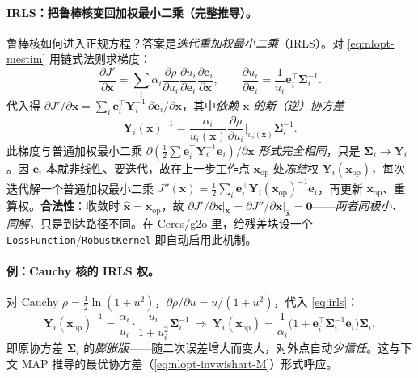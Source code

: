 \paragraph{IRLS：把鲁棒核变回加权最小二乘（完整推导）。}\cite{barfoot2024state}
鲁棒核如何进入正规方程？答案是\emph{迭代重加权最小二乘}（IRLS）。对 \cref{eq:nlopt-mestim} 用链式法则求梯度：
\begin{equation}
  \frac{\partial J'}{\partial\mathbf{x}}=\sum_i\alpha_i\frac{\partial\rho}{\partial u_i}\frac{\partial u_i}{\partial\mathbf{e}_i}\frac{\partial\mathbf{e}_i}{\partial\mathbf{x}},
  \qquad \frac{\partial u_i}{\partial\mathbf{e}_i}=\frac{1}{u_i}\mathbf{e}_i^\top\boldsymbol{\Sigma}_i^{-1}.
  \label{eq:nlopt-irls-grad}
\end{equation}
代入得 $\partial J'/\partial\mathbf{x}=\sum_i\mathbf{e}_i^\top\mathbf{Y}_i^{-1}\,\partial\mathbf{e}_i/\partial\mathbf{x}$，其中\emph{依赖 $\mathbf{x}$ 的新（逆）协方差}
\begin{equation}
  \mathbf{Y}_i(\mathbf{x})^{-1}=\frac{\alpha_i}{u_i(\mathbf{x})}\frac{\partial\rho}{\partial u_i}\Big|_{u_i(\mathbf{x})}\boldsymbol{\Sigma}_i^{-1}.
  \label{eq:irls}
\end{equation}
此梯度与普通加权最小二乘 $\partial(\tfrac12\sum\mathbf{e}_i^\top\mathbf{Y}_i^{-1}\mathbf{e}_i)/\partial\mathbf{x}$ \emph{形式完全相同}，只是 $\boldsymbol{\Sigma}_i\to\mathbf{Y}_i$。因 $\mathbf{e}_i$ 本就非线性、要迭代，故在上一步工作点 $\mathbf{x}_{\mathrm{op}}$ 处\emph{冻结}权 $\mathbf{Y}_i(\mathbf{x}_{\mathrm{op}})$，每次迭代解一个普通加权最小二乘 $J''(\mathbf{x})=\tfrac12\sum_i\mathbf{e}_i^\top\mathbf{Y}_i(\mathbf{x}_{\mathrm{op}})^{-1}\mathbf{e}_i$，再更新 $\mathbf{x}_{\mathrm{op}}$、重算权。\textbf{合法性}：收敛时 $\hat{\mathbf{x}}=\mathbf{x}_{\mathrm{op}}$，故 $\partial J'/\partial\mathbf{x}|_{\hat{\mathbf{x}}}=\partial J''/\partial\mathbf{x}|_{\hat{\mathbf{x}}}=\mathbf{0}$——\emph{两者同极小、同解}，只是到达路径不同。在 Ceres/g2o 里，给残差块设一个 \texttt{LossFunction}/\texttt{RobustKernel} 即自动启用此机制。

\paragraph{例：Cauchy 核的 IRLS 权。}\cite{barfoot2024state}
对 Cauchy $\rho=\tfrac12\ln(1+u^2)$，$\partial\rho/\partial u=u/(1+u^2)$，代入 \cref{eq:irls}：
\begin{equation}
  \mathbf{Y}_i(\mathbf{x}_{\mathrm{op}})^{-1}=\frac{\alpha_i}{u_i}\cdot\frac{u_i}{1+u_i^2}\boldsymbol{\Sigma}_i^{-1}
  \ \Rightarrow\ \mathbf{Y}_i(\mathbf{x}_{\mathrm{op}})=\frac{1}{\alpha_i}\big(1+\mathbf{e}_i^\top\boldsymbol{\Sigma}_i^{-1}\mathbf{e}_i\big)\boldsymbol{\Sigma}_i,
  \label{eq:nlopt-cauchy-Y}
\end{equation}
即原协方差 $\boldsymbol{\Sigma}_i$ 的\emph{膨胀版}——随二次误差增大而变大，对外点自动\emph{少信任}。这与下文 MAP 推导的最优协方差（\cref{eq:nlopt-invwishart-M}）形式呼应。

